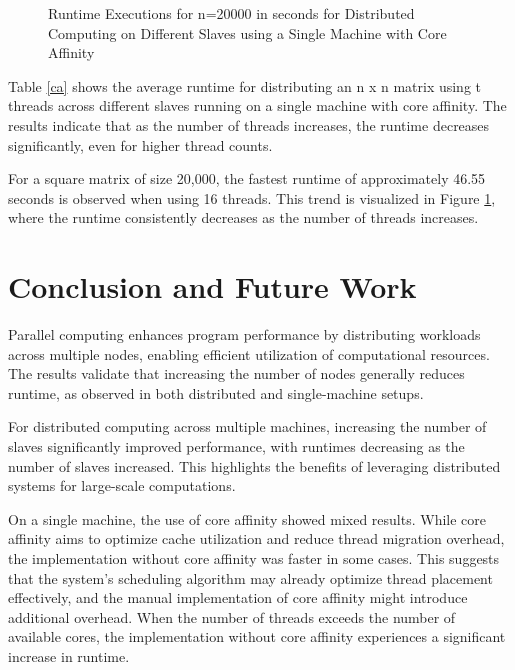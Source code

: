 \documentclass[journal]{./IEEE/IEEEtran}
\begin{document}
\begin{figure}
    \centering
    \caption{Runtime Executions for n=20000 in seconds for Distributed Computing on Different Slaves using a Single Machine with Core Affinity}
    \label{ca_chart}
\end{figure}

Table \ref{ca} shows the average runtime for distributing an n x n matrix using t threads across different slaves running on a single machine with core affinity. The results indicate that as the number of threads increases, the runtime decreases significantly, even for higher thread counts.

For a square matrix of size 20,000, the fastest runtime of approximately 46.55 seconds is observed when using 16 threads. This trend is visualized in Figure \ref{ca_chart}, where the runtime consistently decreases as the number of threads increases.


\section{Conclusion and Future Work}
Parallel computing enhances program performance by distributing workloads across multiple nodes, enabling efficient utilization of computational resources. The results validate that increasing the number of nodes generally reduces runtime, as observed in both distributed and single-machine setups.

For distributed computing across multiple machines, increasing the number of slaves significantly improved performance, with runtimes decreasing as the number of slaves increased. This highlights the benefits of leveraging distributed systems for large-scale computations.

On a single machine, the use of core affinity showed mixed results. While core affinity aims to optimize cache utilization and reduce thread migration overhead, the implementation without core affinity was faster in some cases. This suggests that the system's scheduling algorithm may already optimize thread placement effectively, and the manual implementation of core affinity might introduce additional overhead. When the number of threads exceeds the number of available cores, the implementation without core affinity experiences a significant increase in runtime.
\end{document}
